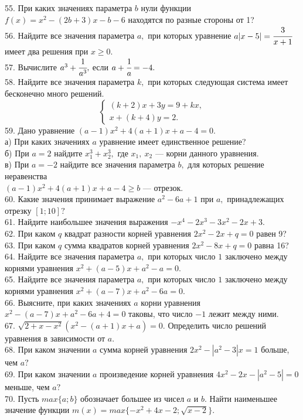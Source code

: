 \documentclass[12pt]{article}
\begin{document}
55. При каких значениях параметра $b$ нули функции $f(x)=x^2-(2b+3)x-b-6$ находятся по разные стороны от 1?\\
56. Найдите все значения параметра $a,$ при которых уравнение $a|x-5|=\cfrac{3}{x+1}$ имеет два решения при $x\geqslant 0.$\\
57. Вычислите $a^3+\cfrac{1}{a^3},$ если $a+\cfrac{1}{a}=-4.$\\
58. Найдите все значения параметра $k,$ при которых следующая система имеет бесконечно много решений.
$$\begin{cases}
(k+2)x+3y=9+kx,\\
x+(k+4)y=2.
\end{cases}
$$
59. Дано уравнение $(a-1)x^2+4(a+1)x+a-4=0.$\\
а) При каких значениях $a$ уравнение имеет единственное решение?\\
б) При $a=2$ найдите $x_1^3+x_2^3,$ где $x_1,\ x_2$ --- корни данного уравнения.\\
в) При $a=-2$ найдите все значения параметра $b,$ для которых решение неравенства\\ $(a-1)x^2+4(a+1)x+a-4\geqslant b$ --- отрезок.\\
60. Какие значения принимает выражение $a^2-6a+1$ при $a,$ принадлежащих отрезку $[1;10]?$\\
61. Найдите наибольшее значения выражения $-x^4-2x^3-3x^2-2x+3.$\\
62. При каком $q$ квадрат разности корней уравнения $2x^2-2x+q=0$ равен 9?\\
63. При каком $q$ сумма квадратов корней уравнения $2x^2-8x+q=0$ равна 16?\\
64. Найдите все значения параметра $a,$ при которых число $1$ заключено между корнями уравнения $x^2+(a-5)x+a^2-a=0.$\\
65. Найдите все значения параметра $a,$ при которых число $1$ заключено между корнями уравнения $x^2+(a-7)x+a^2-6a=0.$\\
66. Выясните, при каких значениях $a$ корни уравнения $x^2-(a-7)x+a^2-6a+4=0$ таковы, что число $-1$ лежит между ними.\\
67. $\sqrt{2+x-x^2}(x^2-(a+1)x+a)=0.$ Определить число решений уравнения в зависимости от $a.$\\
68. При каком значении $a$ сумма корней уравнения $2x^2-|a^2-3|x=1$ больше, чем $a?$\\
69. При каком значении $a$ произведение корней уравнения $4x^2-2x-|a^2-5|=0$ меньше, чем $a?$\\
70. Пусть $max\{a;b\}$ обозначает большее из чисел $a$ и $b.$ Найти наименьшее значение функции $m(x)=max\{-x^2+4x-2; \sqrt{x-2}\}.$\\
\end{document}
